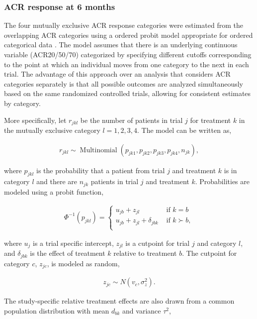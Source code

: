 \documentclass[11pt,final,fleqn]{article}\usepackage[]{graphicx}\usepackage[]{color}
\theoremstyle{plain}
\DeclareMathOperator{\Multinomial}{Multinomial}
\begin{document}
\begin{appendices}
\subsubsection{ACR response at 6 months}
The four mutually exclusive ACR response categories were estimated from the overlapping ACR categories using a ordered probit model appropriate for ordered categorical data \citep{dias2013evidence}. The model assumes that there is an underlying continuous variable (ACR20/50/70) categorized by specifying different cutoffs corresponding to the point at which an individual moves from one category to the next in each trial. The advantage of this approach over an analysis that considers ACR categories separately is that all possible outcomes are analyzed simultaneously based on the same randomized controlled trials, allowing for consistent estimates by category. 

More specifically, let $r_{jkl}$ be the number of patients in trial $j$ for treatment $k$ in the mutually exclusive category $l = 1,2,3,4$. The model can be written as,

\begin{align}
r_{jkl} \sim \Multinomial(p_{jk1}, p_{jk2}, p_{jk3}, p_{jk4}, n_{jk}),
\end{align}

where $p_{jkl}$ is the probability that a patient from trial $j$ and treatment $k$ is in category $l$ and there are $n_{jk}$ patients in trial $j$ and treatment $k$. Probabilities are modeled using a probit function,

\begin{align}
\Phi^{-1}(p_{jkl}) =
 \begin{cases}
     u_{jb} + z_{jl} & \text{ if } k = b \\
     u_{jb} + z_{jl} + \delta_{jbk} & \text{ if } k \succ b, \\
  \end{cases}
\end{align}

where $u_j$ is a trial specific intercept, $z_{jl}$ is a cutpoint for trial $j$ and category $l$, and $\delta_{jbk}$ is the effect of treatment $k$ relative to treatment $b$. The cutpoint for category $c$, $z_{jc}$, is modeled as random,

\begin{align}
z_{jc} \sim N(v_c, \sigma^2_z).
\end{align}

The study-specific relative treatment effects are also drawn from a common population distribution with mean $d_{bk}$ and variance $\tau^2$,


\end{appendices}
\end{document}
